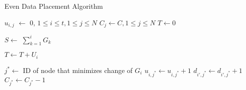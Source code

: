 \begin{algorithm}[H]
\begin{small}
\begin{algorithmic}[1]

\caption{Even Data Placement Algorithm}
\label{alg:edp}
\State $u_{i,j}$ $\leftarrow$ $0$, $1 \le i \le t, 1 \le j \le N$
\State $C_j \leftarrow C, 1 \le j \le N$
\State $T \leftarrow 0$
  \State {}

  \State $S \leftarrow$ $\sum_{k=1}^{i} G_k$

	\State {}     
   \EndFor
   \State $T \leftarrow T + U_i$
\EndFor

\EndFunction
{}
     \State $j^* \leftarrow $ ID of node that minimizes change of $G_i$
     \State $u_{i,j^*} \leftarrow u_{i,j^*} + 1$
     \State $d_{i',j^*} \leftarrow d_{i',j^*}+1$
     \EndFor
     \State $C_{j^*} \leftarrow C_{j^*} - 1$
\EndFor
\EndFunction


\end{algorithmic}
\end{small}
\end{algorithm}
